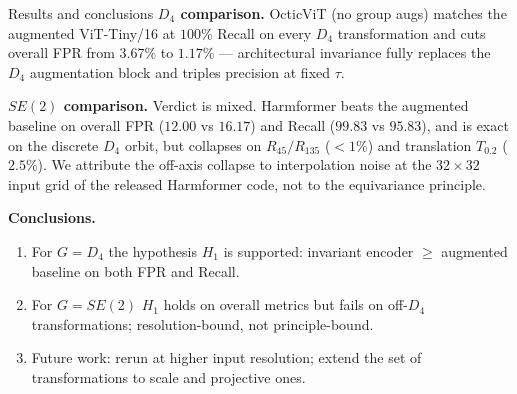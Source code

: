 \documentclass[aspectratio=169]{beamer}
\begin{document}
\begin{frame}{Results and conclusions}\label{slide:results}
    \textbf{$D_4$ comparison.} OcticViT (no group augs) matches the augmented ViT-Tiny/16 at $100\%$ Recall on every $D_4$ transformation and cuts overall FPR from $3.67\%$ to $1.17\%$ --- architectural invariance fully replaces the $D_4$ augmentation block and triples precision at fixed $\tau$.

    \textbf{$SE(2)$ comparison.} Verdict is mixed. Harmformer beats the augmented baseline on overall FPR ($12.00$ vs $16.17$) and Recall ($99.83$ vs $95.83$), and is exact on the discrete $D_4$ orbit, but collapses on $R_{45}/R_{135}$ ($<1\%$) and translation $T_{0.2}$ ($2.5\%$). We attribute the off-axis collapse to interpolation noise at the $32{\times}32$ input grid of the released Harmformer code, not to the equivariance principle.

    \textbf{Conclusions.}
    \begin{enumerate}[1)]
        \item For $G=D_4$ the hypothesis $H_1$ is supported: invariant encoder $\geq$ augmented baseline on both FPR and Recall.
        \item For $G=SE(2)$ $H_1$ holds on overall metrics but fails on off-$D_4$ transformations; resolution-bound, not principle-bound.
        \item Future work: rerun at higher input resolution; extend the set of transformations to scale and projective ones.
    \end{enumerate}
\end{frame}
\end{document}
